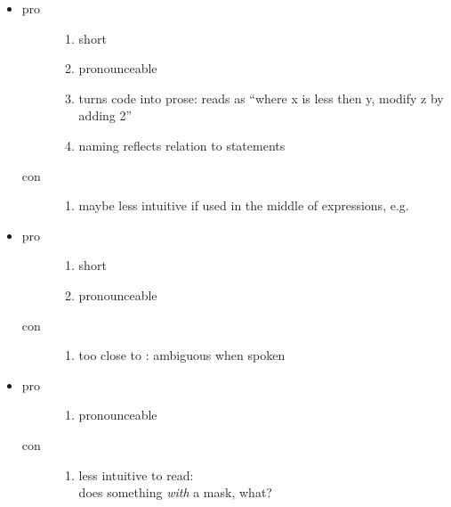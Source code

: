 \begin{itemize}
  \item {}
    \begin{description}
      \item[pro]
        \begin{enumerate}
          \item short
          \item pronounceable
          \item turns code into prose:  reads as “where x is less then y, modify z by adding 2”
          \item naming reflects relation to  statements
        \end{enumerate}
      \item[con]
        \begin{enumerate}
          \item maybe less intuitive if used in the middle of expressions, e.g. 
        \end{enumerate}
    \end{description}

  \item {}
    \begin{description}
      \item[pro]
        \begin{enumerate}
          \item short
          \item pronounceable
        \end{enumerate}
      \item[con]
        \begin{enumerate}
          \item too close to : ambiguous when spoken
        \end{enumerate}
    \end{description}

  \item {}
    \begin{description}
      \item[pro]
        \begin{enumerate}
          \item pronounceable
        \end{enumerate}
      \item[con]
        \begin{enumerate}
          \item less intuitive to read: \\
            does something \emph{with} a mask, what?
        \end{enumerate}
    \end{description}


\end{itemize}
